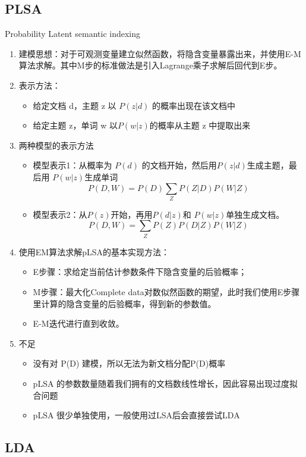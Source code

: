 \documentclass[UTF8]{article}%
\begin{document}
	\subsection{PLSA}
	Probability  Latent semantic indexing
		\begin{enumerate}
			\item 建模思想：对于可观测变量建立似然函数，将隐含变量暴露出来，并使用E-M算法求解。其中M步的标准做法是引入Lagrange乘子求解后回代到E步。
			\item 表示方法：
				\begin{itemize}
					\item 给定文档 d，主题 z 以 $P(z|d)$ 的概率出现在该文档中
					\item 给定主题 z，单词 w 以$ P(w|z) $的概率从主题 z 中提取出来
					
				\end{itemize}
			\item 两种模型的表示方法
			\begin{itemize}
				\item 模型表示1：从概率为 $P(d)$ 的文档开始，然后用$ P(z|d) $生成主题，最后用 $P(w|z) $生成单词
				$$P(D,W)=P(D)\sum_{Z}P(Z|D)P(W|Z)$$
				\item 模型表示2：从$ P(z) $开始，再用$ P(d|z) $和 $P(w|z)$单独生成文档。
				$$P(D,W)=\sum_{Z}P(Z)P(D|Z)P(W|Z)$$
			\end{itemize}
			\item 使用EM算法求解pLSA的基本实现方法：
				\begin{itemize}
					\item E步骤：求给定当前估计参数条件下隐含变量的后验概率；
					\item M步骤：最大化Complete data对数似然函数的期望，此时我们使用E步骤里计算的隐含变量的后验概率，得到新的参数值。
					\item E-M迭代进行直到收敛。
				\end{itemize}
			\item 不足
				\begin{itemize}
					\item 没有对 P(D) 建模，所以无法为新文档分配P(D)概率
					\item pLSA 的参数数量随着我们拥有的文档数线性增长，因此容易出现过度拟合问题
					\item pLSA 很少单独使用，一般使用过LSA后会直接尝试LDA
				\end{itemize}
		\end{enumerate}
	
	\subsection{LDA}
\end{document}
